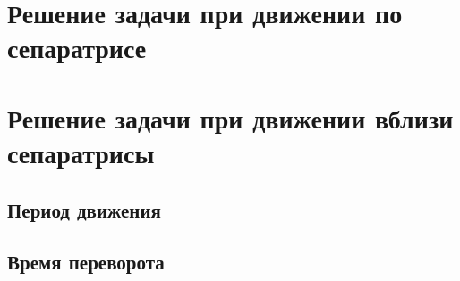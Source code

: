 \documentclass{article}
\begin{document}
\section{Решение задачи при движении по сепаратрисе}
\section{Решение задачи при движении вблизи сепаратрисы}
\subsection{Период движения}
\subsection{Время переворота}
\end{document}
